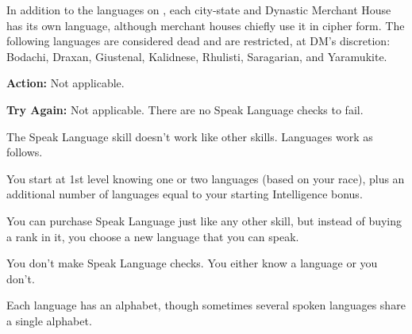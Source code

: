 
In addition to the languages on , each city‐state and Dynastic Merchant House has its own language, although merchant houses chiefly use it in cipher form. The following languages are considered dead and are restricted, at DM’s discretion: Bodachi, Draxan, Giustenal, Kalidnese, Rhulisti, Saragarian, and Yaramukite.

\textbf{Action:} Not applicable.

\textbf{Try Again:} Not applicable. There are no Speak Language checks to fail.

The Speak Language skill doesn’t work like other skills. Languages work as follows.

\begin{itemize*}
\item You start at 1st level knowing one or two languages (based on your race), plus an additional number of languages equal to your starting Intelligence bonus.
\item You can purchase Speak Language just like any other skill, but instead of buying a rank in it, you choose a new language that you can speak.
\item You don’t make Speak Language checks. You either know a language or you don’t.
\item Each language has an alphabet, though sometimes several spoken languages share a single alphabet.
\end{itemize*}
